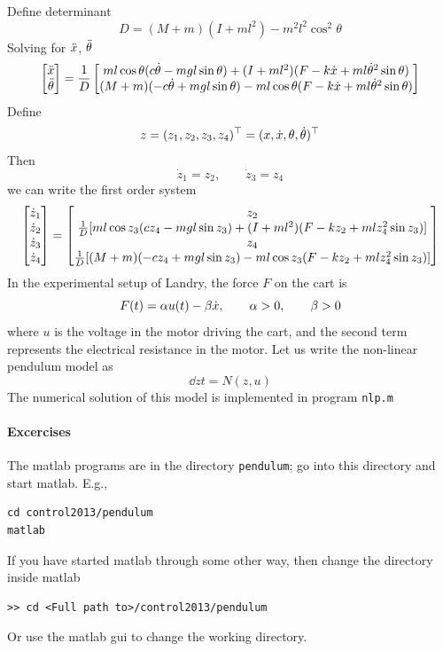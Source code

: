 \documentclass[12pt]{article}
\begin{document}
Define determinant
\[
D = (M+m)(I+ml^2) - m^2 l^2 \cos^2\theta
\]
Solving for $\ddot{x}$, $\ddot{\theta}$
\[
\begin{bmatrix}
\ddot{x} \\ \ddot{\theta} \end{bmatrix} = \frac{1}{D} \begin{bmatrix}
m l \cos\theta (c \dot{\theta} - mgl\sin\theta) + (I+ml^2)(F - k\dot{x} + ml\dot{\theta}^2 \sin\theta) \\
(M+m)(-c\dot{\theta} + mgl\sin\theta) - ml\cos\theta(F - k\dot{x} + ml\dot{\theta}^2 \sin\theta)
\end{bmatrix}
\]
Define
\[
z = (z_1, z_2, z_3, z_4)^\top = (x, \dot{x}, \theta, \dot{\theta})^\top
\]
Then
\[
\dot{z}_1 = z_2, \qquad \dot{z}_3 = z_4
\]
we can write the first order system
\[
\begin{bmatrix}
\dot{z}_1 \\ \dot{z}_2 \\ \dot{z}_3 \\ \dot{z}_4 \end{bmatrix} = \begin{bmatrix}
z_2 \\
\frac{1}{D} [ m l \cos z_3 (c z_4 - mgl\sin z_3) + (I+ml^2)(F - k z_2 + ml z_4^2 \sin      z_3)] \\
z_4 \\
\frac{1}{D}[ (M+m)(-c z_4 + mgl\sin z_3) - ml\cos z_3 (F - k z_2 + ml z_4^2 \sin z_3)]
\end{bmatrix}
\]
In the experimental setup of Landry, the force $F$ on the cart is
\[
F(t) = \alpha u(t) - \beta \dot{x}, \qquad \alpha > 0, \qquad \beta > 0
\]
where $u$ is the voltage in the motor driving the cart, and the second term represents the electrical resistance in the motor. Let us write the non-linear pendulum model as
\[
\dd{z}{t} = N(z,u)
\]
The numerical solution of this model is implemented in program {\tt nlp.m}
\paragraph{Excercises}
The matlab programs are in the directory {\tt pendulum}; go into this directory and start matlab. E.g.,
\begin{lstlisting}
cd control2013/pendulum
matlab
\end{lstlisting}
If you have started matlab through some other way, then change the directory inside matlab
\begin{lstlisting}
>> cd <Full path to>/control2013/pendulum
\end{lstlisting}
Or use the matlab gui to change the working directory.
\end{document}
